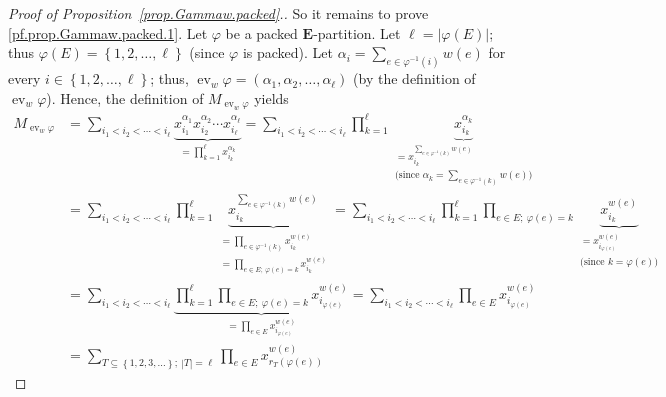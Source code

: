 \documentclass[12pt]{article}
\theoremstyle{plain}
\theoremstyle{definition}
\theoremstyle{remark}
\let\sumnonlimits\sum
\let\prodnonlimits\prod
\renewcommand{\sum}{\sumnonlimits\limits}
\renewcommand{\prod}{\prodnonlimits\limits}
\newcommand{\ev}{\operatorname{ev}}
\newcommand{\EE}{{\mathbf{E}}}
\begin{document}
\begin{proof}[Proof of Proposition~\ref{prop.Gammaw.packed}.]
So it remains to prove \eqref{pf.prop.Gammaw.packed.1}. Let $\varphi$
be a packed $\EE$-partition. Let
$\ell = \left|\varphi\left(E\right)\right|$; thus
$\varphi\left(E\right) = \left\{1, 2, \ldots, \ell\right\}$
(since $\varphi$ is packed).
Let $\alpha_i = \sum_{e \in \varphi^{-1}\left(i\right)}
w\left(e\right)$ for every $i \in \left\{ 1, 2, \ldots, \ell \right\}$;
thus,
$\ev_w \varphi = \left(\alpha_1, \alpha_2, \ldots, \alpha_\ell\right)$
(by the definition of $\ev_w \varphi$).
Hence, the definition of $M_{\ev_w \varphi}$ yields
\begin{align}
M_{\ev_w \varphi}
&= \sum_{i_1 < i_2 < \cdots < i_\ell}
\underbrace{x_{i_1}^{\alpha_1} x_{i_2}^{\alpha_2} \cdots x_{i_\ell}^{\alpha_\ell}}
_{= \prod_{k = 1}^\ell x_{i_k}^{\alpha_k}}
= \sum_{i_1 < i_2 < \cdots < i_\ell}
\prod_{k = 1}^\ell \underbrace{x_{i_k}^{\alpha_k}}
                              _{\substack{= x_{i_k}^{\sum_{e \in \varphi^{-1}\left(k\right)}
                                w\left(e\right)} \\
                                \text{(since } \alpha_k = \sum_{e \in \varphi^{-1}\left(k\right)}
                                w\left(e\right) \text{)}}}
\nonumber \\
&= \sum_{i_1 < i_2 < \cdots < i_\ell}
\prod_{k = 1}^\ell \underbrace{x_{i_k}^{\sum_{e \in \varphi^{-1}\left(k\right)}
                                w\left(e\right)}}
                              _{\substack{= \prod_{e \in \varphi^{-1}\left(k\right)}
                                x_{i_k}^{w\left(e\right)} \\
                                = \prod_{e \in E;\ \varphi\left(e\right) = k}
                                x_{i_k}^{w\left(e\right)} }}
= \sum_{i_1 < i_2 < \cdots < i_\ell}
\prod_{k = 1}^\ell \prod_{e \in E;\ \varphi\left(e\right) = k}
\underbrace{x_{i_k}^{w\left(e\right)}}_{\substack{
         =x_{i_{\varphi\left(e\right)}}^{w\left(e\right)} \\
         \text{(since } k = \varphi\left(e\right) \text{)}
         }}
\nonumber \\
&= \sum_{i_1 < i_2 < \cdots < i_\ell}
\underbrace{\prod_{k = 1}^\ell \prod_{e \in E;\ \varphi\left(e\right) = k}
x_{i_{\varphi\left(e\right)}}^{w\left(e\right)}}
_{ = \prod_{e \in E} x_{i_{\varphi\left(e\right)}}^{w\left(e\right)}}
= \sum_{i_1 < i_2 < \cdots < i_\ell}
\prod_{e \in E} x_{i_{\varphi\left(e\right)}}^{w\left(e\right)}
\nonumber \\
&= \sum_{T \subseteq \left\{1, 2, 3, \ldots\right\} ; \ \left|T\right| = \ell}
\prod_{e \in E} x_{r_T\left(\varphi\left(e\right)\right)}^{w\left(e\right)}

\end{align}
\end{proof}
\end{document}
